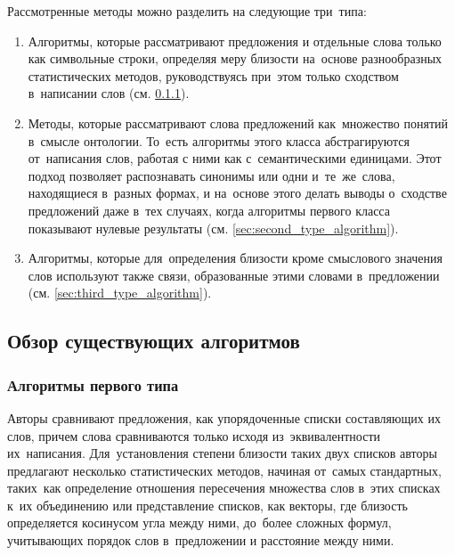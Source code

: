 Рассмотренные методы можно разделить на следующие три~типа:

\begin{enumerate}

\item{
Алгоритмы, которые рассматривают предложения и отдельные слова только как символьные строки, 
определяя меру близости на~основе разнообразных статистических методов, 
руководствуясь при~этом только сходством в~написании слов (см. \ref{sec:first_type_algorithm}).
}

\item {
Методы, которые рассматривают слова предложений как~множество понятий в~смысле онтологии.
То~есть алгоритмы этого класса абстрагируются от~написания слов, работая с ними
как с~семантическими единицами\cite{wordnetSim}. 
Этот подход позволяет распознавать синонимы или одни и~те~же~слова, находящиеся в~разных формах,
и на~основе этого делать выводы о~сходстве предложений даже в~тех случаях,
когда алгоритмы первого класса показывают нулевые результаты (см. \ref{sec:second_type_algorithm}).
}

\item {
Алгоритмы, которые  для~определения близости  кроме смыслового значения слов
используют также связи, образованные этими словами в~предложении (см. \ref{sec:third_type_algorithm}).

}
\end{enumerate}

\subsection{Обзор существующих алгоритмов}
\subsubsection{Алгоритмы первого типа}
\label{sec:first_type_algorithm}

Авторы \cite{statisticalSim} сравнивают предложения, 
как упорядоченные списки составляющих их слов, 
причем слова сравниваются только исходя из~эквивалентности их~написания. 
Для~установления степени близости таких двух списков авторы предлагают несколько статистических методов,
начиная от~самых стандартных, таких~как определение отношения пересечения множества слов в~этих списках к~их объединению
или представление списков, как векторы, где близость определяется косинусом угла между ними,
до~более сложных формул, учитывающих порядок слов в~предложении и расстояние между ними.

